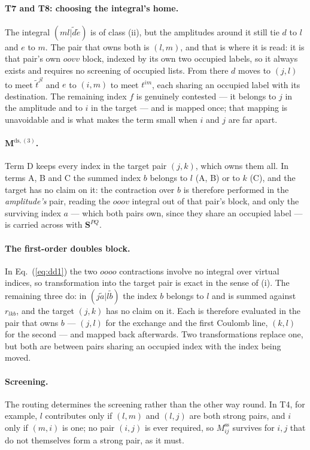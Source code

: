 \documentclass[aip,jcp,amsmath,amssymb,preprint,superscriptaddress]{revtex4-2}%
\newcommand{\pao}[1]{\tilde{#1}}
\begin{document}
\paragraph{T7 and T8: choosing the integral's home.}
The integral $(ml|\pao{d}\pao{e})$ is of class (ii), but the amplitudes around
it still tie $d$ to $l$ and $e$ to $m$. The pair that owns both is $(l,m)$,
and that is where it is read: it is that pair's own $oovv$ block, indexed by
its own two occupied labels, so it always exists and requires no screening of
occupied lists. From there $d$ moves to $(j,l)$ to meet $\tilde{t}^{jl}$ and
$e$ to $(i,m)$ to meet $t^{im}$, each sharing an occupied label with its
destination. The remaining index $f$ is genuinely contested --- it belongs to
$j$ in the amplitude and to $i$ in the target --- and is mapped once; that
mapping is unavoidable and is what makes the term small when $i$ and $j$ are
far apart.

\paragraph{$\mathbf{M}^{\text{ds},(3)}$.}
Term D keeps every index in the target pair $(j,k)$, which owns them all. In
terms A, B and C the summed index $b$ belongs to $l$ (A, B) or to $k$ (C), and
the target has no claim on it: the contraction over $b$ is therefore performed
in the \emph{amplitude's} pair, reading the $ooov$ integral out of that pair's
block, and only the surviving index $a$ --- which both pairs own, since they
share an occupied label --- is carried across with $\mathbf{S}^{PQ}$.

\paragraph{The first-order doubles block.}
In Eq.~(\ref{eq:dd1}) the two $oooo$ contractions involve no integral over
virtual indices, so transformation into the target pair is exact in the sense
of (i). The remaining three do: in $(j\pao{a}|l\pao{b})$ the index $b$ belongs
to $l$ and is summed against $r_{lkb}$, and the target $(j,k)$ has no claim on
it. Each is therefore evaluated in the pair that owns $b$ --- $(j,l)$ for the
exchange and the first Coulomb line, $(k,l)$ for the second --- and mapped
back afterwards. Two transformations replace one, but both are between pairs
sharing an occupied index with the index being moved.

\paragraph{Screening.} The routing determines the screening rather than the
other way round. In T4, for example, $l$ contributes only if $(l,m)$ and
$(l,j)$ are both strong pairs, and $i$ only if $(m,i)$ is one; no pair
$(i,j)$ is ever required, so $M^{\text{ss}}_{ij}$ survives for $i,j$ that do
not themselves form a strong pair, as it must.
\end{document}

